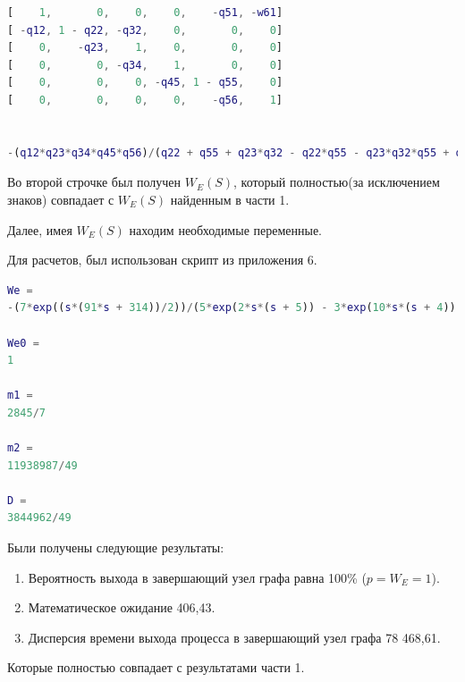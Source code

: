 \begin{lstlisting}[language={matlab}, caption={Результат}, basicstyle=\ttfamily]
[    1,       0,    0,    0,    -q51, -w61]
[ -q12, 1 - q22, -q32,    0,       0,    0]
[    0,    -q23,    1,    0,       0,    0]
[    0,       0, -q34,    1,       0,    0]
[    0,       0,    0, -q45, 1 - q55,    0]
[    0,       0,    0,    0,    -q56,    1]
 
 
-(q12*q23*q34*q45*q56)/(q22 + q55 + q23*q32 - q22*q55 - q23*q32*q55 + q12*q23*q34*q45*q51 - 1)
\end{lstlisting}
Во второй строчке был получен $W_E(S)$, который полностью(за исключением знаков) совпадает с $W_E(S)$ найденным в части 1.

Далее, имея $W_E(S)$ находим необходимые переменные.

Для расчетов, был использован скрипт из приложения 6.

\begin{lstlisting}[language={matlab}, caption={Результат}, basicstyle=\ttfamily]
We =
-(7*exp((s*(91*s + 314))/2))/(5*exp(2*s*(s + 5)) - 3*exp(10*s*(s + 4)) + 30*exp(2*s*(4*s + 15)) - exp((3*s*(15*s + 52))/2) + 10*exp((s*(41*s + 136))/2) + 2*exp((s*(91*s + 314))/2) - 50)
 
We0 =
1
 
m1 =
2845/7
 
m2 =
11938987/49
 
D =
3844962/49
\end{lstlisting}
Были получены следующие результаты:
\begin{enumerate}
\item Вероятность выхода в завершающий узел графа равна 100\% ($p=W_E=1$).
\item Математическое ожидание 406,43.
\item Дисперсия времени выхода процесса в завершающий узел графа 78 468,61.
\end{enumerate}
Которые полностью совпадает с результатами части 1.
